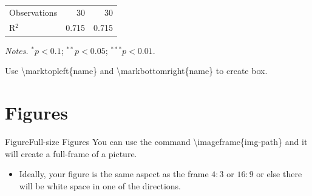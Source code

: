\documentclass[aspectratio=169]{beamer}
\begin{document}
\begin{frame}
\begin{table}[!htbp]
\begin{adjustbox}{max width = \textwidth, width = 0.5\textwidth, center}
\begin{threeparttable}
\begin{tabular}{@{} l *{2}{r} @{}}
                \midrule 
                Observations & 30 & 30 \\ 
                R$^{2}$ & 0.715 & 0.715 \\ 
                \bottomrule

            \end{tabular} 
            \begin{tablenotes}
                \item \textit{Notes.} $^{*} p<0.1$; $^{**} p<0.05$; $^{***} p<0.01$.
            \end{tablenotes}
        \end{threeparttable}
    \end{adjustbox}
\end{table}

{\small
Use \textbackslash marktopleft\{name\} and \textbackslash markbottomright\{name\} to create box.
}
\end{frame}

\section{Figures}



\begin{frame}{Figure}{Full-size Figures}
    You can use the command \textbackslash imageframe\{img-path\} and it will create a full-frame of a picture. 
    
    \begin{itemize}
        \item Ideally, your figure is the same aspect as the frame $4:3$ or $16:9$ or else there will be white space in one of the directions.
    \end{itemize}
\end{frame}
\end{document}
